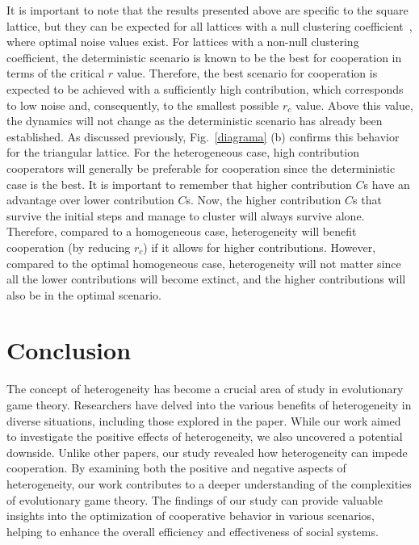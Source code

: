 \documentclass[twocolumn,aps,amsmath,pre,floatfix,superscriptaddress]{revtex4-2}
\begin{document}
It is important to note that the results presented above are specific to the square lattice, but they can be expected for all lattices with a null clustering coefficient~\cite{perc2013evolutionary}, where optimal noise values exist. 
%
For lattices with a non-null clustering coefficient, the deterministic scenario is known to be the best for cooperation in terms of the critical $r$ value.
%
Therefore, the best scenario for cooperation is expected to be achieved with a sufficiently high contribution, which corresponds to  low noise and, consequently, to the smallest possible $r_c$ value. Above this value, the dynamics will not change as the deterministic scenario has already been established. As discussed previously, Fig.~\ref{diagrama} (b) confirms this behavior for the triangular lattice.
%
For the heterogeneous case, high contribution cooperators will generally be preferable for cooperation since the deterministic case is the best. It is important to remember that higher contribution $C$s have an advantage over lower contribution $C$s.
%
Now, the higher contribution $C$s that survive the initial steps and manage to cluster will always survive alone.
%
Therefore, compared to a homogeneous case, heterogeneity will benefit cooperation (by reducing $r_c$) if it allows for higher contributions.
%
However, compared to the optimal homogeneous case, heterogeneity will not matter since all the lower contributions will become extinct, and the higher contributions will also be in the optimal scenario.




\section{Conclusion}\label{conclusion}



The concept of heterogeneity has become a crucial area of study in evolutionary game theory. Researchers have delved into the various benefits of heterogeneity in diverse situations, including those explored in the paper. While our work aimed to investigate the positive effects of heterogeneity, we also uncovered a potential downside. Unlike other papers, our study revealed how heterogeneity can impede cooperation. By examining both the positive and negative aspects of heterogeneity, our work contributes to a deeper understanding of the complexities of evolutionary game theory. The findings of our study can provide valuable insights into the optimization of cooperative behavior in various scenarios, helping to enhance the overall efficiency and effectiveness of social systems. 
\end{document}
